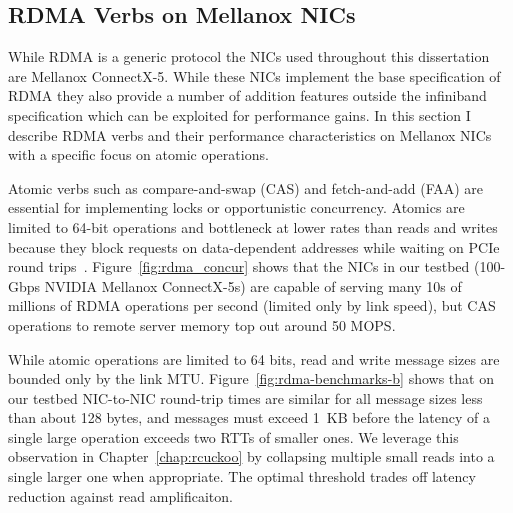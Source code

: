 \documentclass[12pt]{ucsddissertation}
\begin{document}
\subsection{RDMA Verbs on Mellanox NICs}

While RDMA is a generic protocol the NICs used throughout this dissertation are Mellanox ConnectX-5.
While these NICs implement the base specification of RDMA they also provide a number of addition
features outside the infiniband specification which can be exploited for performance gains.  In this
section I describe RDMA verbs and their performance characteristics on Mellanox NICs with a specific
focus on atomic operations.

Atomic verbs such as compare-and-swap (CAS) and fetch-and-add (FAA) are essential for implementing
locks or opportunistic concurrency. Atomics are limited to 64-bit operations and bottleneck at lower
rates than reads and writes because they block requests on data-dependent addresses while waiting on
PCIe round trips~\cite{design-guidelines,sherman}.  Figure~\ref{fig:rdma_concur} shows that the NICs
in our testbed (100-Gbps NVIDIA Mellanox ConnectX-5s) are capable of serving many 10s of millions of
RDMA operations per second (limited only by link speed), but CAS operations to remote server memory
top out around 50 MOPS.  


While atomic operations are limited to 64 bits, read and write message sizes are bounded only by the
link MTU.
Figure~\ref{fig:rdma-benchmarks-b} shows that on our testbed NIC-to-NIC round-trip times are similar
for all message sizes less than about 128 bytes, and
messages must exceed 1~KB before the latency of a single large operation exceeds two RTTs of smaller
ones.  We leverage this observation in Chapter~\ref{chap:rcuckoo} by collapsing multiple small reads
into a single larger one when appropriate.  The optimal threshold trades off latency reduction
against read amplificaiton.

\end{document}
